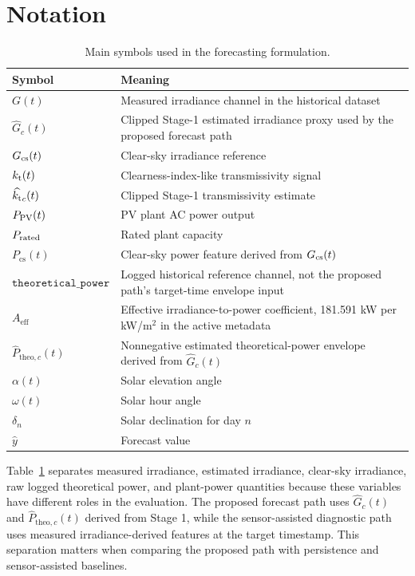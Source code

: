 \clearpage
\appendices
\section{Notation}
\label{app:notation}

\begin{table}[!t]
\caption{Main symbols used in the forecasting formulation.}
\label{tab:notation}
\centering
\small
\begin{tabularx}{\columnwidth}{@{}l>{\raggedright\arraybackslash}X@{}}
\toprule
Symbol & Meaning \\
\midrule
$G(t)$ & Measured irradiance channel in the historical dataset \\
$\widehat{G}_{c}(t)$ & Clipped Stage-1 estimated irradiance proxy used by the proposed forecast path \\
$G_{\mathrm{cs}}(t)$ & Clear-sky irradiance reference \\
$k_{\mathrm{t}}(t)$ & Clearness-index-like transmissivity signal \\
$\widehat{k_{\mathrm{t}}}_{c}(t)$ & Clipped Stage-1 transmissivity estimate \\
$P_{\mathrm{PV}}(t)$ & PV plant AC power output \\
$P_{\mathrm{rated}}$ & Rated plant capacity \\
$P_{\mathrm{cs}}(t)$ & Clear-sky power feature derived from $G_{\mathrm{cs}}(t)$ \\
$\texttt{theoretical\_power}$ & Logged historical reference channel, not the proposed path's target-time envelope input \\
$A_{\mathrm{eff}}$ & Effective irradiance-to-power coefficient, 181.591 kW per kW/m$^2$ in the active metadata \\
$\widehat{P}_{\mathrm{theo},c}(t)$ & Nonnegative estimated theoretical-power envelope derived from $\widehat{G}_{c}(t)$ \\
$\alpha(t)$ & Solar elevation angle \\
$\omega(t)$ & Solar hour angle \\
$\delta_n$ & Solar declination for day $n$ \\
$\hat{y}$ & Forecast value \\
\bottomrule
\end{tabularx}
\end{table}

Table~\ref{tab:notation} separates measured irradiance, estimated irradiance, clear-sky irradiance, raw logged theoretical power, and plant-power quantities because these variables have different roles in the evaluation. The proposed forecast path uses $\widehat{G}_{c}(t)$ and $\widehat{P}_{\mathrm{theo},c}(t)$ derived from Stage 1, while the sensor-assisted diagnostic path uses measured irradiance-derived features at the target timestamp. This separation matters when comparing the proposed path with persistence and sensor-assisted baselines.

